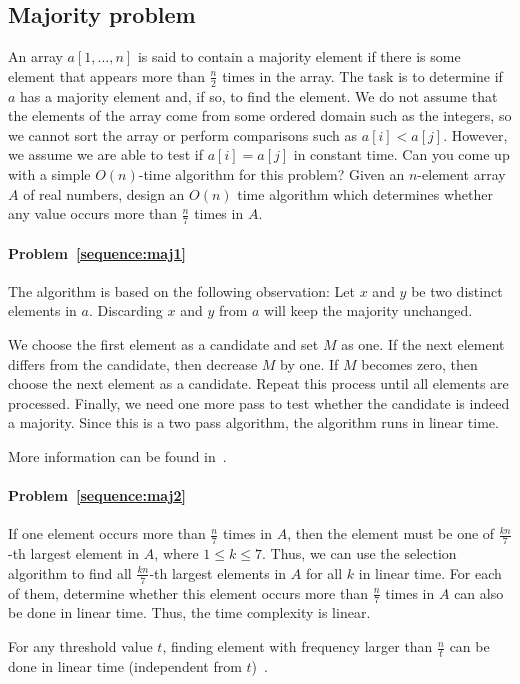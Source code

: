 \subsection{Majority problem}
\begin{Exercise}
\Question An array $a[1, \dots, n]$ is said to contain a majority element if there is some element that appears more than $\frac{n}{2}$ times in the array. The task is to determine if $a$ has a majority element and, if so, to find the element. We do not assume that the elements of the array come from some ordered domain such as the integers, so we cannot sort the array or perform comparisons such as $a[i] < a[j]$. However, we assume we are able to test if $a[i] = a[j]$ in constant time. Can you come up with a simple $O(n)$-time algorithm for this problem? \label{sequence:maj1} 
\Question Given an $n$-element array $A$ of real numbers, design an $O(n)$ time algorithm which determines whether any value occurs more than $\frac{n}{7}$ times in $A$. \label{sequence:maj2}
\end{Exercise}

\begin{Answer}
\paragraph{Problem~\ref{sequence:maj1}}
The algorithm is based on the following observation: Let $x$ and $y$ be two distinct elements in $a$. Discarding $x$ and $y$ from $a$ will keep the majority unchanged. 

We choose the first element as a candidate and set $M$ as one. If the next element differs from the candidate, then decrease $M$ by one. If $M$ becomes zero, then choose the next element as a candidate. Repeat this process until all elements are processed. Finally, we need one more pass to test whether the candidate is indeed a majority. Since this is a two pass algorithm, the algorithm runs in linear time.

\begin{remark}
More information can be found in~\cite{Misra1982}.
\end{remark}

\paragraph{Problem~\ref{sequence:maj2}}
If one element occurs more than $\frac{n}{7}$ times in $A$, then the element must be one of $\frac{kn}{7}$-th largest element in $A$, where $1 \leq k \leq 7$. Thus, we can use the selection algorithm to find all $\frac{kn}{7}$-th largest elements in $A$ for all $k$ in linear time. For each of them, determine whether this element occurs more than $\frac{n}{7}$ times in $A$ can also be done in linear time. Thus, the time complexity is linear.

\begin{remark}
For any threshold value $t$, finding element with frequency larger than $\frac{n}{t}$ can be done in linear time (independent from $t$)~\cite{Karp2003}.
\end{remark}
\end{Answer}

